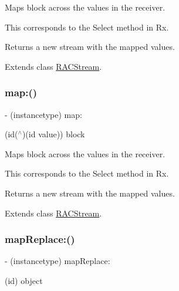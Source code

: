 Maps {\ttfamily block} across the values in the receiver.

This corresponds to the {\ttfamily Select} method in Rx.

Returns a new stream with the mapped values. 

Extends class \mbox{\hyperlink{interface_r_a_c_stream_ae8e14cc70fb3979e6128d28b003bba3f}{R\+A\+C\+Stream}}.

\mbox{\label{category_r_a_c_stream_07_operations_08_ae8e14cc70fb3979e6128d28b003bba3f}} 
\subsubsection{\texorpdfstring{map\+:()}{map:()}\hspace{0.1cm}{\footnotesize\ttfamily [3/3]}}
{\footnotesize\ttfamily -\/ (instancetype) map\+: \begin{DoxyParamCaption}\item[{(id($^\wedge$)(id value))}]{block }\end{DoxyParamCaption}}

Maps {\ttfamily block} across the values in the receiver.

This corresponds to the {\ttfamily Select} method in Rx.

Returns a new stream with the mapped values. 

Extends class \mbox{\hyperlink{interface_r_a_c_stream_ae8e14cc70fb3979e6128d28b003bba3f}{R\+A\+C\+Stream}}.

\mbox{\label{category_r_a_c_stream_07_operations_08_a9e55da434f4cf84e14f9133ac48383b8}} 
\subsubsection{\texorpdfstring{map\+Replace\+:()}{mapReplace:()}\hspace{0.1cm}{\footnotesize\ttfamily [1/3]}}
{\footnotesize\ttfamily -\/ (instancetype) map\+Replace\+: \begin{DoxyParamCaption}\item[{(id)}]{object }\end{DoxyParamCaption}}


